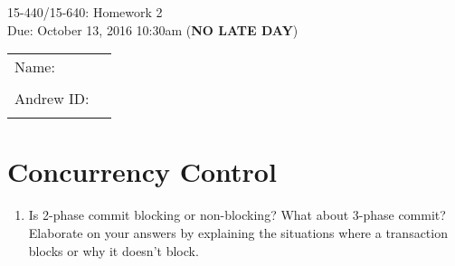 \documentclass{article}
\def\answer#1{
    \vspace*{0.5em}\\
    \noindent\fbox{%
    \parbox{\textwidth}{%
		#1
    }%
}
}
\newcommand{\mycoursenum}{15-440/15-640}
\newcommand{\myhwnum}{2}
\newcommand{\myname}{}   %
\newcommand{\myandrew}{}  %
\begin{document}
\medskip
\thispagestyle{plain}
\begin{center}
{\Large \mycoursenum: Homework \myhwnum}\\
Due: October 13, 2016 10:30am (\large\textbf{NO LATE DAY}) \\
\medskip
\begin{tabular}{| l p{3in}|}
\hline
Name: \myname& \\
& \\ \hline
Andrew ID: \myandrew & \\
&\\
\hline
\end{tabular}
\end{center}




\section{Concurrency Control}
\begin{enumerate}
\item Is 2-phase commit blocking or non-blocking? What about 3-phase commit? Elaborate on your answers by explaining the situations where a transaction blocks or why it doesn’t block.
\end{enumerate}

\end{document}
